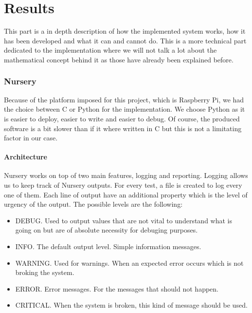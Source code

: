 \documentclass[12pt]{article}
\begin{document}
\clearpage
\part{Results}

This part is a in depth description of how the implemented system works, how it has been developed and what it can and cannot do. This is a more technical part dedicated to the implementation where we will not talk a lot about the mathematical concept behind it as those have already been explained before.\\

\clearpage
\section{Nursery}

Because of the platform imposed for this project, which is Raspberry Pi, we had the choice between C or Python for the implementation. We choose Python as it is easier to deploy, easier to write and easier to debug. Of course, the produced software is a bit slower than if it where written in C but this is not a limitating factor in our case.

\subsection{Architecture}

Nursery works on top of two main features, logging and reporting. Logging allows us to keep track of Nursery outputs. For every test, a file is created to log every one of them. Each line of output have an additional property which is the level of urgency of the output. The possible levels are the following:

\begin{itemize}
\item DEBUG. Used to output values that are not vital to understand what is going on but are of absolute necessity for debuging purposes.
\item INFO. The default output level. Simple information messages.
\item WARNING. Used for warnings. When an expected error occurs which is not broking the system.
\item ERROR. Error messages. For the messages that should not happen.
\item CRITICAL. When the system is broken, this kind of message should be used.
\end{itemize}
\end{document}
